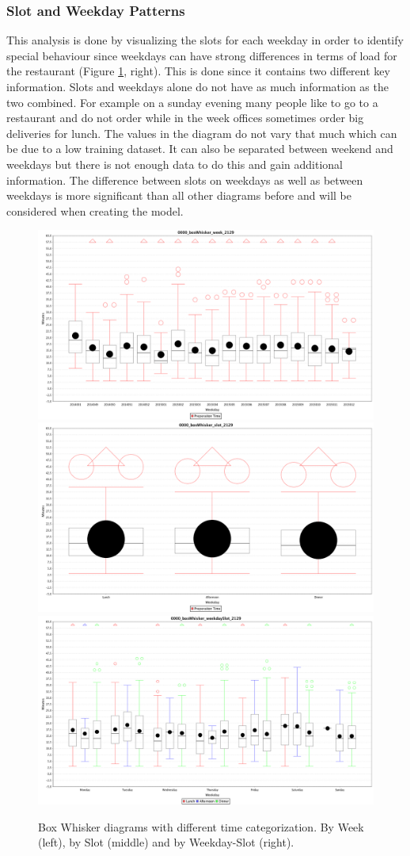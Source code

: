 \subsubsection{Slot and Weekday Patterns}
This analysis is done by visualizing the slots for each weekday in order to identify special behaviour since weekdays can have strong differences in terms of load for the restaurant (Figure \ref{fig:triple_boxWhisker}, right). This is done since it contains two different key information. Slots and weekdays alone do not have as much information as the two combined. For example on a sunday evening many people like to go to a restaurant and do not order while in the week offices sometimes order big deliveries for lunch. The values in the diagram do not vary that much which can be due to a low training dataset. It can also be separated between weekend and weekdays but there is not enough data to do this and gain additional information.\newline
The difference between slots on weekdays as well as between weekdays is more significant than all other diagrams before and will be considered when creating the model.

\begin{figure}[htp]

\centering
\includegraphics[width=.3\textwidth]{images/0000_boxWhisker_week_2129.png}\hfill
\includegraphics[width=.3\textwidth]{images/0000_boxWhisker_slot_2129.png}\hfill
\includegraphics[width=.3\textwidth]{images/0000_boxWhisker_weekdaySlot_2129.png}

\caption{Box Whisker diagrams with different time categorization. By Week (left), by Slot (middle) and by Weekday-Slot (right).}
\label{fig:triple_boxWhisker}

\end{figure}

